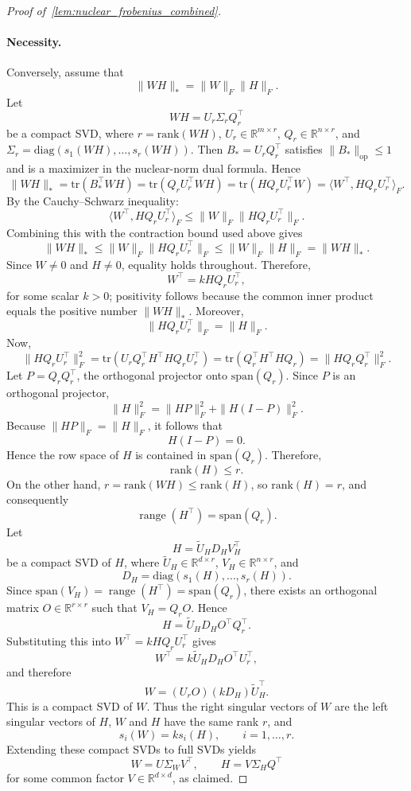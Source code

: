 \documentclass[11pt]{article}
\begin{document}
\begin{proof}[Proof of~\cref{lem:nuclear_frobenius_combined}]
  \paragraph{Necessity.}
  Conversely, assume that
  \[
  \|WH\|_* = \|W\|_{F}   \|H\|_{F}.
  \]
  Let
  \[
  WH = U_r \Sigma_r Q_r^\top
  \]
  be a compact SVD, where \(r = \mathrm{rank}(WH)\), \(U_r \in \mathbb{R}^{m \times r}\), \(Q_r \in \mathbb{R}^{n \times r}\), and \(\Sigma_r = \mathrm{diag}(s_1(WH), \dots, s_r(WH))\). Then
\(B_* = U_r Q_r^\top\) satisfies \(\|B_*\|_{\mathrm{op}} \le 1\) and is a maximizer in the nuclear-norm dual formula. Hence
  \[
\|WH\|_* = \mathrm{tr}(B_*^\top WH)
  = \mathrm{tr}(Q_r U_r^\top WH)
  = \mathrm{tr}(H Q_r U_r^\top W)
  = \langle W^\top, H Q_r U_r^\top \rangle_F.
  \]
  By the Cauchy--Schwarz inequality:
  \[
  \langle W^\top, H Q_r U_r^\top \rangle_F \le
  \|W\|_F   \|H Q_r U_r^\top \|_F.
  \]
  Combining this with the contraction bound used above gives
  \[
  \|WH\|_*
  \le \|W\|_F   \|H Q_r U_r^\top\|_F
  \le \|W\|_F   \|H\|_F
  =
  \|WH\|_*.
  \]
  Since \(W\neq 0\) and \(H\neq 0\), equality holds throughout. Therefore,
  \[
  W^\top = k   H Q_r U_r^\top,
  \]
  for some scalar \( k > 0 \); positivity follows because the common inner product equals the positive number \(\|WH\|_*\). Moreover,
  \[
  \|H Q_r U_r^\top \|_F = \|H\|_F.
  \]
  Now,
  \[
  \|H Q_r U_r^\top \|_F^2
  = \mathrm{tr}(U_r Q_r^\top H^\top H Q_r U_r^\top)
  = \mathrm{tr}(Q_r^\top H^\top H Q_r)
  = \|H Q_r Q_r^\top\|_F^2.
  \]
  Let \(P = Q_r Q_r^\top\), the orthogonal projector onto \(\mathrm{span}(Q_r)\). Since \(P\) is an orthogonal projector,
  \[
  \|H\|_F^2 = \|HP\|_F^2 + \|H(I-P)\|_F^2.
  \]
  Because \(\|HP\|_F = \|H\|_F\), it follows that
  \[
  H(I-P)=0.
  \]
  Hence the row space of \(H\) is contained in \(\mathrm{span}(Q_r)\). Therefore,
  \[
  \mathrm{rank}(H) \le r.
  \]
  On the other hand, \(r = \mathrm{rank}(WH) \le \mathrm{rank}(H)\), so \(\mathrm{rank}(H)=r\), and consequently
  \[
  \operatorname{range}(H^\top)=\mathrm{span}(Q_r).
  \]
  Let
  \[
  H = \widetilde U_H D_H V_H^\top
  \]
  be a compact SVD of \(H\), where \(\widetilde U_H \in \mathbb{R}^{d \times r}\), \(V_H \in \mathbb{R}^{n \times r}\), and
  \[
  D_H = \mathrm{diag}(s_1(H), \dots, s_r(H)).
  \]
  Since \(\mathrm{span}(V_H)=\operatorname{range}(H^\top)=\mathrm{span}(Q_r)\), there exists an orthogonal matrix \(O \in \mathbb{R}^{r \times r}\) such that \(V_H = Q_r O\). Hence
  \[
  H = \widetilde U_H D_H O^\top Q_r^\top.
  \]
  Substituting this into \(W^\top = k H Q_r U_r^\top\) gives
  \[
  W^\top = k   \widetilde U_H D_H O^\top U_r^\top,
  \]
  and therefore
  \[
  W = (U_r O)   (k D_H)   \widetilde U_H^\top.
  \]
  This is a compact SVD of \(W\). Thus the right singular vectors of \(W\) are the left singular vectors of \(H\), \(W\) and \(H\) have the same rank \(r\), and
  \[
  s_i(W) = k  s_i(H), \qquad i = 1, \dots, r.
  \]
  Extending these compact SVDs to full SVDs yields
  \[
  W = U \Sigma_W V^\top, \qquad H = V \Sigma_H Q^\top
  \]
  for some common factor \(V \in \mathbb{R}^{d \times d}\), as claimed.


\end{proof}
\end{document}
